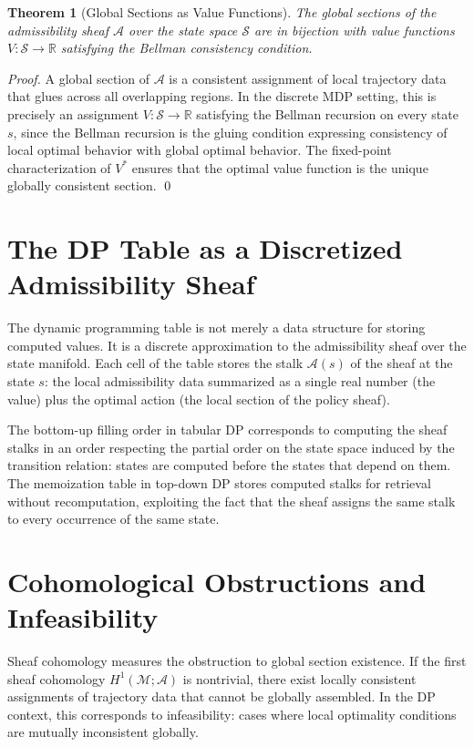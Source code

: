 \documentclass[12pt, a4paper, openany]{book}
\theoremstyle{plain}
\newtheorem{theorem}{Theorem}[chapter]
\theoremstyle{definition}
\theoremstyle{remark}
\begin{document}
\begin{theorem}[Global Sections as Value Functions]
The global sections of the admissibility sheaf $\mathcal{A}$ over the state space $\mathcal{S}$ are in bijection with value functions $V: \mathcal{S} \to \mathbb{R}$ satisfying the Bellman consistency condition.
\end{theorem}

\begin{proof}
A global section of $\mathcal{A}$ is a consistent assignment of local trajectory data that glues across all overlapping regions. In the discrete MDP setting, this is precisely an assignment $V: \mathcal{S} \to \mathbb{R}$ satisfying the Bellman recursion on every state $s$, since the Bellman recursion is the gluing condition expressing consistency of local optimal behavior with global optimal behavior. The fixed-point characterization of $V^*$ ensures that the optimal value function is the unique globally consistent section. \qed
\end{proof}

\section{The DP Table as a Discretized Admissibility Sheaf}

The dynamic programming table is not merely a data structure for storing computed values. It is a discrete approximation to the admissibility sheaf over the state manifold. Each cell of the table stores the stalk $\mathcal{A}(s)$ of the sheaf at the state $s$: the local admissibility data summarized as a single real number (the value) plus the optimal action (the local section of the policy sheaf).

The bottom-up filling order in tabular DP corresponds to computing the sheaf stalks in an order respecting the partial order on the state space induced by the transition relation: states are computed before the states that depend on them. The memoization table in top-down DP stores computed stalks for retrieval without recomputation, exploiting the fact that the sheaf assigns the same stalk to every occurrence of the same state.

\section{Cohomological Obstructions and Infeasibility}

Sheaf cohomology measures the obstruction to global section existence. If the first sheaf cohomology $H^1(\mathcal{M}; \mathcal{A})$ is nontrivial, there exist locally consistent assignments of trajectory data that cannot be globally assembled. In the DP context, this corresponds to infeasibility: cases where local optimality conditions are mutually inconsistent globally.
\end{document}
